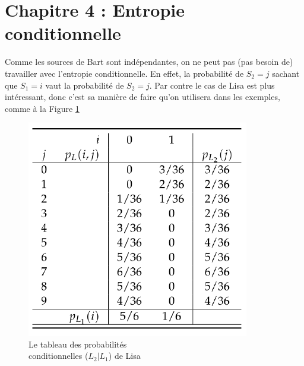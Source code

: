 \documentclass[11pt,a4paper]{article}
\begin{document}
\section[Entropie conditionnelle]{Chapitre 4 : Entropie conditionnelle}
\begin{exemple}
	Comme les sources de Bart sont indépendantes, on ne peut pas (pas besoin de) travailler avec l'entropie conditionnelle. En effet, la probabilité de $S_2 = j$ sachant que $S_1 = i$ vaut la probabilité de $S_2 = j$. Par contre le cas de Lisa est plus intéressant, donc c'est sa manière de faire qu'on utilisera dans les exemples, comme à la Figure \ref{conditionnel lisa}
\end{exemple}
\begin{figure}[!h]
	\centering
	\includegraphics[scale=0.5]{images/entropie_conditionnelle_lisa}
	\caption{Le tableau des probabilités\\ conditionnelles ($L_2|L_1$) de Lisa}
	\label{conditionnel lisa}
\end{figure}
\begin{center}
\end{center}
\end{document}
